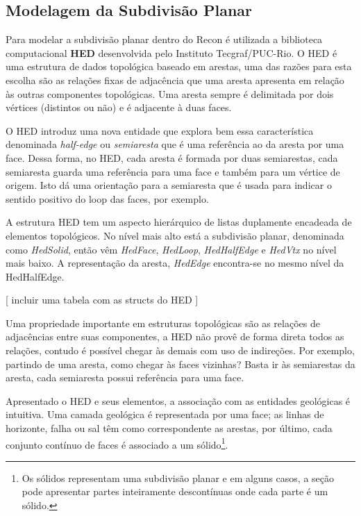 \subsection{Modelagem da Subdivisão Planar}

Para modelar a subdivisão planar dentro do Recon é utilizada a biblioteca computacional \textbf{HED} desenvolvida pelo Instituto Tecgraf/PUC-Rio. O HED é uma estrutura de dados topológica baseado em arestas, uma das razões para esta escolha são as relações fixas de adjacência que uma aresta apresenta em relação às outras componentes topológicas. Uma aresta sempre é delimitada por dois vértices (distintos ou não) e é adjacente à duas faces.

O HED introduz uma nova entidade que explora bem essa característica denominada \textit{half-edge} ou \textit{semiaresta} que é uma referência ao  da aresta por uma face. Dessa forma, no HED, cada aresta é formada por duas semiarestas, cada semiaresta guarda uma referência para uma face e também para um vértice de origem. Isto dá uma orientação para a semiaresta que é usada para indicar o sentido positivo do loop das faces, por exemplo.

A estrutura HED tem um aspecto hierárquico de listas duplamente encadeada de elementos topológicos. No nível mais alto está a subdivisão planar, denominada como \textit{HedSolid}, então vêm \textit{HedFace}, \textit{HedLoop}, \textit{HedHalfEdge} e \textit{HedVtx} no nível mais baixo. A representação da aresta, \textit{HedEdge} encontra-se no mesmo nível da HedHalfEdge.

[ incluir uma tabela com as structs do HED ]

Uma propriedade importante em estruturas topológicas são as relações de adjacências entre suas componentes, a HED não provê de forma direta todos as relações, contudo é possível chegar às demais com uso de indireções. Por exemplo, partindo de uma aresta, como chegar às faces vizinhas? Basta ir às semiarestas da aresta, cada semiaresta possui referência para uma face.

Apresentado o HED e seus elementos, a associação com as entidades geológicas é intuitiva. Uma camada geológica é representada por uma face; as linhas de horizonte, falha ou sal têm como correspondente as arestas, por último, cada conjunto contínuo de faces é associado a um sólido\footnote{Os sólidos representam uma subdivisão planar e em alguns casos, a seção pode apresentar partes inteiramente descontínuas onde cada parte é um sólido.}.

